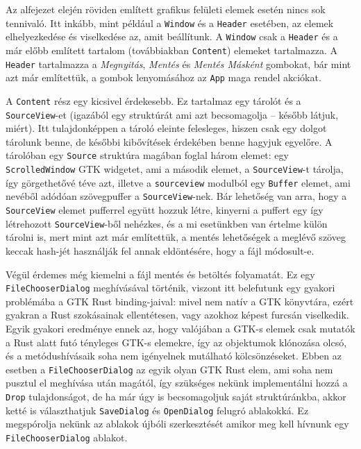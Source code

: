 Az alfejezet elején röviden említett grafikus felületi elemek esetén nincs sok tennivaló.
Itt inkább, mint például a \texttt{Window} és a \texttt{Header} esetében, az elemek elhelyezkedése és viselkedése az,
amit beállítunk.
A \texttt{Window} csak a \texttt{Header} és a már előbb említett tartalom (továbbiakban \texttt{Content})
elemeket tartalmazza.
A \texttt{Header} tartalmazza a \textit{Megnyitás}, \textit{Mentés} és \textit{Mentés Másként} gombokat,
bár mint azt már említettük, a gombok lenyomásához az \texttt{App} maga rendel akciókat.

\label{content:talk}
A \texttt{Content} rész egy kicsivel érdekesebb.
Ez tartalmaz egy tárolót és a \texttt{SourceView}-et (igazából egy struktúrát ami azt becsomagolja -- 
később látjuk, miért).
Itt tulajdonképpen a tároló eleinte felesleges, hiszen csak egy dolgot tárolunk benne, de későbbi kibővítések
érdekében benne hagyjuk egyelőre.
A tárolóban egy \texttt{Source} struktúra magában foglal három elemet: egy \texttt{ScrolledWindow} GTK widgetet,
ami a második elemet, a \texttt{SourceView}-t tárolja, így görgethetővé téve azt, 
illetve a \texttt{sourceview} modulból egy \texttt{Buffer} elemet, ami nevéből adódóan szövegpuffer a \texttt{SourceView}-nek.
Bár lehetőség van arra, hogy a \texttt{SourceView} elemet pufferrel együtt hozzuk létre,
kinyerni a puffert egy így létrehozott \texttt{SourceView}-ből nehézkes,
és a mi esetünkben van értelme külön tárolni is, mert mint azt már említettük, a mentés lehetőségek
a meglévő szöveg keccak hash-jét használják fel annak eldöntésére, hogy a fájl módosult-e.

\label{file_chooser_dialog}
Végül érdemes még kiemelni a fájl mentés és betöltés folyamatát.
Ez egy \texttt{File\-Chooser\-Dialog} meghívásával történik, viszont itt belefutunk egy gyakori
problémába a GTK Rust binding-jaival: mivel nem natív a GTK könyvtára,
ezért gyakran a Rust szokásainak ellentétesen, vagy azokhoz képest furcsán viselkedik.
Egyik gyakori eredménye ennek az, hogy valójában a GTK-s elemek csak mutatók a Rust alatt futó
tényleges GTK-s elemekre\cite{glib:no_need_for_borrows}, így az objektumok klónozása olcsó,
és a metódushívásaik soha nem igényelnek mutálható kölcsönzéseket.
Ebben az esetben a \texttt{FileChooserDialog} az egyik olyan GTK Rust elem, ami soha nem pusztul el meghívása után magától,
így szükséges nekünk implementálni hozzá a \texttt{Drop} tulajdonságot, de ha már úgy is becsomagoljuk
saját struktúránkba, akkor ketté is választhatjuk \texttt{SaveDialog} és \texttt{OpenDialog} felugró ablakokká.
Ez megspórolja nekünk az ablakok újbóli szerkesztését amikor meg kell hívnunk egy \texttt{FileChooserDialog} ablakot.

